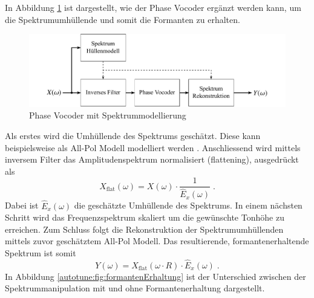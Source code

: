 In Abbildung \ref{autotune:fig:pitchShiftingSpektrumModellierung} ist dargestellt, wie der Phase Vocoder ergänzt werden kann,
um die Spektrumumhüllende und somit die Formanten zu erhalten.
\begin{figure}
    \centering
    \includegraphics[width=\textwidth]{papers/autotune/images/Spektrum-Modellierung.pdf}
    \caption{Phase Vocoder mit Spektrummodellierung}
    \label{autotune:fig:pitchShiftingSpektrumModellierung}
\end{figure}
Als erstes wird die Umhüllende des Spektrums geschätzt.
Diese kann beispielsweise als All-Pol Modell modelliert werden \cite{autotune:allPollEstimationOfVocalTract}.
Anschliessend wird mittels inversem Filter das Amplitudenspektrum normalisiert (flattening), ausgedrückt als
\begin{equation}
    X_{\text{flat}}(\omega)
    =
    X(\omega) \cdot \frac{1}{\hat{E}_x(\omega)} \;.
\end{equation}
Dabei ist $\hat{E}_x(\omega)$ die geschätzte Umhüllende des Spektrums.
In einem nächsten Schritt wird das Frequenzspektrum skaliert um die gewünschte Tonhöhe zu erreichen.
Zum Schluss folgt die Rekonstruktion der Spektrumumhüllenden mittels zuvor geschätztem All-Pol Modell.
Das resultierende, formantenerhaltende Spektrum ist somit
\begin{equation}
    Y(\omega)
    =
    X_{\text{flat}}(\omega \cdot R) \cdot \hat{E}_x(\omega) \;.
\end{equation}
In Abbildung \ref{autotune:fig:formantenErhaltung} ist der Unterschied zwischen der Spektrummanipulation mit und ohne Formantenerhaltung dargestellt.
